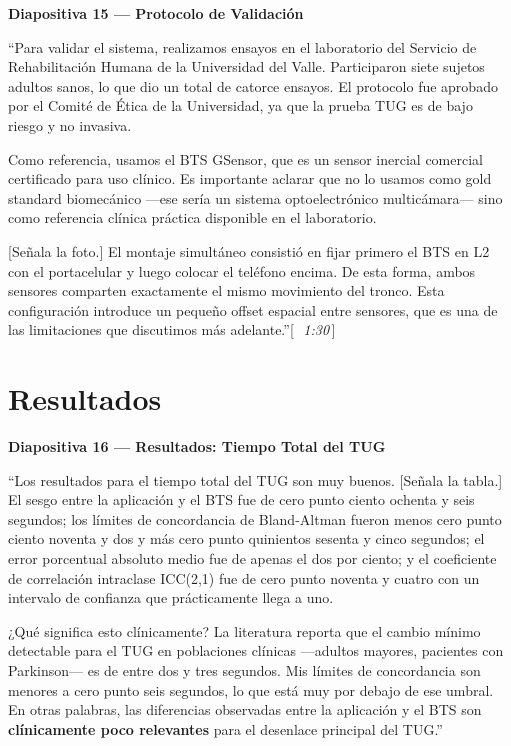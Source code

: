 \documentclass[12pt]{article}
\newcommand{\diap}[2]{%
  \begin{slidebox}
    \textbf{\color{slateblue}Diapositiva #1 — #2}
  \end{slidebox}%
}
\newcommand{\tiempo}[1]{\hfill{\small\color{timebox}[\,\textit{~#1}\,]}}
\begin{document}
\diap{15}{Protocolo de Validación}

``Para validar el sistema, realizamos ensayos en el laboratorio del Servicio de Rehabilitación Humana de la Universidad del Valle. Participaron siete sujetos adultos sanos, lo que dio un total de catorce ensayos. El protocolo fue aprobado por el Comité de Ética de la Universidad, ya que la prueba TUG es de bajo riesgo y no invasiva.

Como referencia, usamos el BTS GSensor, que es un sensor inercial comercial certificado para uso clínico. Es importante aclarar que no lo usamos como gold standard biomecánico —ese sería un sistema optoelectrónico multicámara— sino como referencia clínica práctica disponible en el laboratorio.

[Señala la foto.] El montaje simultáneo consistió en fijar primero el BTS en L2 con el portacelular y luego colocar el teléfono encima. De esta forma, ambos sensores comparten exactamente el mismo movimiento del tronco. Esta configuración introduce un pequeño offset espacial entre sensores, que es una de las limitaciones que discutimos más adelante.''\tiempo{1:30}

\section{Resultados}

\diap{16}{Resultados: Tiempo Total del TUG}

``Los resultados para el tiempo total del TUG son muy buenos. [Señala la tabla.] El sesgo entre la aplicación y el BTS fue de cero punto ciento ochenta y seis segundos; los límites de concordancia de Bland-Altman fueron menos cero punto ciento noventa y dos y más cero punto quinientos sesenta y cinco segundos; el error porcentual absoluto medio fue de apenas el dos por ciento; y el coeficiente de correlación intraclase ICC(2,1) fue de cero punto noventa y cuatro con un intervalo de confianza que prácticamente llega a uno.

¿Qué significa esto clínicamente? La literatura reporta que el cambio mínimo detectable para el TUG en poblaciones clínicas —adultos mayores, pacientes con Parkinson— es de entre dos y tres segundos. Mis límites de concordancia son menores a cero punto seis segundos, lo que está muy por debajo de ese umbral. En otras palabras, las diferencias observadas entre la aplicación y el BTS son \textbf{clínicamente poco relevantes} para el desenlace principal del TUG.''
\end{document}
